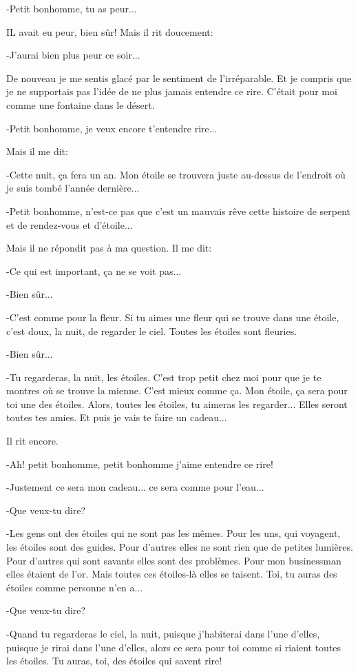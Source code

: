 \documentclass{report}
\begin{document}
-Petit bonhomme, tu as peur...

IL avait eu peur, bien sûr! Mais il rit doucement:

-J'aurai bien plus peur ce soir...

De nouveau je me sentis glacé par le sentiment de l'irréparable. Et je compris que je ne supportais pas l'idée de ne plus jamais entendre ce rire. C'était pour moi comme une fontaine dans le désert.

-Petit bonhomme, je veux encore t'entendre rire...

Mais il me dit:

-Cette nuit, ça fera un an. Mon étoile se trouvera juste au-dessus de l'endroit où je suis tombé l'année dernière...

-Petit bonhomme, n'est-ce pas que c'est un mauvais rêve cette histoire de serpent et de rendez-vous et d'étoile...

Mais il ne répondit pas à ma question. Il me dit:

-Ce qui est important, ça ne se voit pas...

-Bien sûr...

-C'est comme pour la fleur. Si tu aimes une fleur qui se trouve dans une étoile, c'est doux, la nuit, de regarder le ciel. Toutes les étoiles sont fleuries.

-Bien sûr...

-Tu regarderas, la nuit, les étoiles. C'est trop petit chez moi pour que je te montres où se trouve la mienne. C'est mieux comme ça. Mon étoile, ça sera pour toi une des étoiles. Alors, toutes les étoiles, tu aimeras les regarder... Elles seront toutes tes amies. Et puis je vais te faire un cadeau...

Il rit encore.

-Ah! petit bonhomme, petit bonhomme j'aime entendre ce rire!

-Justement ce sera mon cadeau... ce sera comme pour l'eau...

-Que veux-tu dire?

-Les gens ont des étoiles qui ne sont pas les mêmes. Pour les uns, qui voyagent, les étoiles sont des guides. Pour d'autres elles ne sont rien que de petites lumières. Pour d'autres qui sont savants elles sont des problèmes. Pour mon businessman elles étaient de l'or. Mais toutes ces étoiles-là elles se taisent. Toi, tu auras des étoiles comme personne n'en a...

-Que veux-tu dire?

-Quand tu regarderas le ciel, la nuit, puisque j'habiterai dans l'une d'elles, puisque je rirai dans l'une d'elles, alors ce sera pour toi comme si riaient toutes les étoiles. Tu auras, toi, des étoiles qui savent rire!
\end{document}
